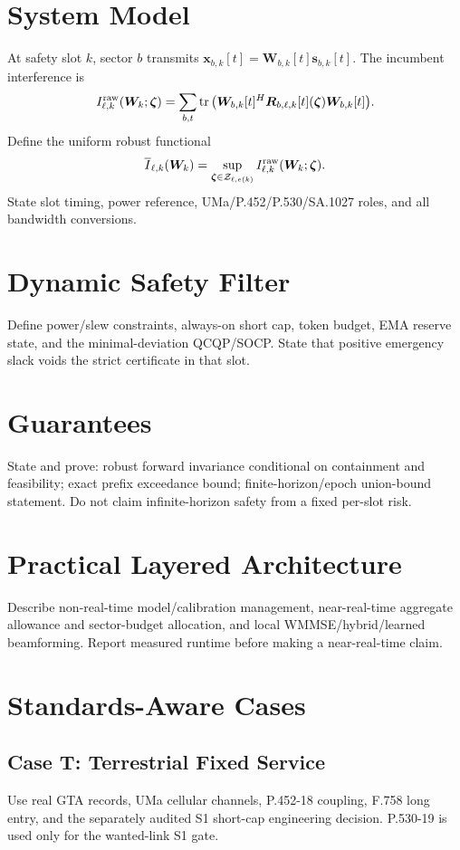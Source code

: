 \documentclass[journal]{IEEEtran}
\newcommand{\W}{\bm W}
\newcommand{\R}{\bm R}
\newcommand{\tr}{\operatorname{tr}}
\begin{document}
\section{System Model}
At safety slot $k$, sector $b$ transmits $\bm x_{b,k}[t]=\W_{b,k}[t]\bm s_{b,k}[t]$. The incumbent interference is
\begin{equation}
 I^{\rm raw}_{\ell,k}(\W_k;\bm\zeta)=\sum_{b,t}\tr\big(\W_{b,k}[t]^H\R_{b,\ell,k}[t](\bm\zeta)\W_{b,k}[t]\big).
\end{equation}
Define the uniform robust functional
\begin{equation}
 \overline I_{\ell,k}(\W_k)=\sup_{\bm\zeta\in\mathcal Z_{\ell,e(k)}}I^{\rm raw}_{\ell,k}(\W_k;\bm\zeta).
\end{equation}
State slot timing, power reference, UMa/P.452/P.530/SA.1027 roles, and all bandwidth conversions.

\section{Dynamic Safety Filter}
Define power/slew constraints, always-on short cap, token budget, EMA reserve state, and the minimal-deviation QCQP/SOCP. State that positive emergency slack voids the strict certificate in that slot.

\section{Guarantees}
State and prove: robust forward invariance conditional on containment and feasibility; exact prefix exceedance bound; finite-horizon/epoch union-bound statement. Do not claim infinite-horizon safety from a fixed per-slot risk.

\section{Practical Layered Architecture}
Describe non-real-time model/calibration management, near-real-time aggregate allowance and sector-budget allocation, and local WMMSE/hybrid/learned beamforming. Report measured runtime before making a near-real-time claim.

\section{Standards-Aware Cases}
\subsection{Case T: Terrestrial Fixed Service}
Use real GTA records, UMa cellular channels, P.452-18 coupling, F.758 long entry, and the separately audited S1 short-cap engineering decision. P.530-19 is used only for the wanted-link S1 gate.
\end{document}
